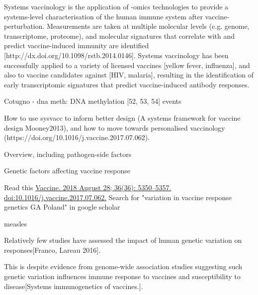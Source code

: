 \begin{outline}
    Systems vaccinology is the application of -omics technologies to provide a systems-level characterisation of the human immune system after vaccine-perturbation.
    Measurements are taken at multiple molecular levels (e.g. genome, transcriptome, proteome), and molecular signatures that correlate with and predict vaccine-induced immunity are identified [http://dx.doi.org/10.1098/rstb.2014.0146].
    Systems vaccinology has been successfully applied to a variety of licensed vaccines [yellow fever, influenza], and also to vaccine candidates against [HIV, malaria], resulting in the identification of early transcriptomic signatures that predict vaccine-induced antibody responses.


    Cotugno
    - dna meth: DNA methylation [52, 53, 54] events

    How to use sysvacc to inform better design (A systems framework for vaccine design Mooney2013), and how to move towards personalised vaccinology (https://doi.org/10.1016/j.vaccine.2017.07.062).

    Overview, including pathogen-side factors

Genetic factors affecting vaccine response


    Read this \url{Vaccine. 2018 August 28; 36(36): 5350–5357. doi:10.1016/j.vaccine.2017.07.062.}
    Search for "variation in vaccine response genetics GA Poland" in google scholar



    measles

    Relatively few studies have assessed the impact of human genetic variation on responses[Franco, Lareau 2016].

    This is despite evidence from genome-wide association studies suggesting such genetic variation influences immune response to vaccines and susceptibility to disease[Systems immunogenetics of vaccines.].


\end{outline}
